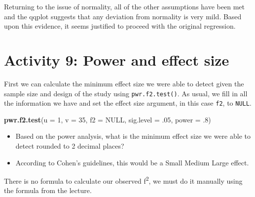 \documentclass[]{book}
\newenvironment{Shaded}{\begin{snugshade}}{\end{snugshade}}
\newcommand{\DataTypeTok}[1]{\textcolor[rgb]{0.13,0.29,0.53}{#1}}
\newcommand{\DecValTok}[1]{\textcolor[rgb]{0.00,0.00,0.81}{#1}}
\newcommand{\FloatTok}[1]{\textcolor[rgb]{0.00,0.00,0.81}{#1}}
\newcommand{\KeywordTok}[1]{\textcolor[rgb]{0.13,0.29,0.53}{\textbf{#1}}}
\newcommand{\NormalTok}[1]{#1}
\newcommand{\OperatorTok}[1]{\textcolor[rgb]{0.81,0.36,0.00}{\textbf{#1}}}
\newcommand{\OtherTok}[1]{\textcolor[rgb]{0.56,0.35,0.01}{#1}}
\newcommand{\StringTok}[1]{\textcolor[rgb]{0.31,0.60,0.02}{#1}}
\providecommand{\tightlist}{%
  \setlength{\itemsep}{0pt}\setlength{\parskip}{0pt}}
\begin{document}
Returning to the issue of normality, all of the other assumptions have been met and the qqplot suggests that any deviation from normality is very mild. Based upon this evidence, it seems justified to proceed with the original regression.

\hypertarget{activity-9-power-and-effect-size-1}{%
\section{Activity 9: Power and effect size}\label{activity-9-power-and-effect-size-1}}

First we can calculate the minimum effect size we were able to detect given the sample size and design of the study using \texttt{pwr.f2.test()}. As usual, we fill in all the information we have and set the effect size argument, in this case \texttt{f2}, to \texttt{NULL}.

\begin{Shaded}
\begin{Highlighting}[]
\KeywordTok{pwr.f2.test}\NormalTok{(}\DataTypeTok{u =} \DecValTok{1}\NormalTok{, }\DataTypeTok{v =} \DecValTok{35}\NormalTok{, }\DataTypeTok{f2 =} \OtherTok{NULL}\NormalTok{, }\DataTypeTok{sig.level =} \FloatTok{.05}\NormalTok{, }\DataTypeTok{power =} \FloatTok{.8}\NormalTok{)}
\end{Highlighting}
\end{Shaded}

\begin{itemize}
\tightlist
\item
  Based on the power analysis, what is the minimum effect size we were able to detect rounded to 2 decimal places? \\
\item
  According to Cohen's guidelines, this would be a Small Medium Large effect.
\end{itemize}

There is no formula to calculate our observed f\textsuperscript{2}, we must do it manually using the formula from the lecture.

\begin{Shaded}
\end{Shaded}
\end{document}
